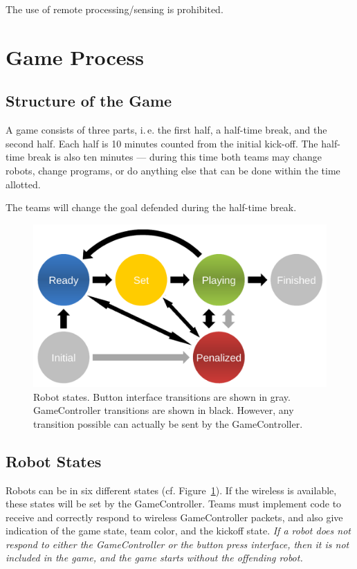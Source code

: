 \documentclass[12pt]{article}
\newcommand{\ie}{\mbox{i.\,e.}\xspace}
\newcommand{\cf}{\mbox{cf.}\xspace}
\begin{document}
The use of remote processing/sensing is prohibited.


\newpage


\section{Game Process}
\label{sec:game_process}

\subsection{Structure of the Game}
\label{sec:game_struct}

A game consists of three parts, \ie the first half, a half-time break, and the second half. Each half is 10 minutes counted from the initial kick-off. The half-time break is also ten minutes --- during this time both teams may change robots, change programs, or do anything else that can be done within the time allotted. 

The teams will change the goal defended during the half-time break.

\begin{figure}[t]
\centerline{\includegraphics[width=0.9\columnwidth]{figs/states.pdf}}
\caption{Robot states. Button interface transitions are shown in gray. GameController transitions are shown in black. However, any transition possible can actually be sent by the GameController.}
\label{fig:robot_states}
\end{figure}

\subsection{Robot States}
\label{sec:robot_states}

Robots can be in six different states (\cf Figure~\ref{fig:robot_states}). If the wireless is available, these states will be set by the GameController. Teams must implement code to receive and correctly respond to wireless GameController packets, and also give indication of the game state, team color, and the kickoff state.
\emph{If a robot does not respond to either the GameController or the button press interface, then it is not included in the game, and the game starts without the offending robot.}
\end{document}
